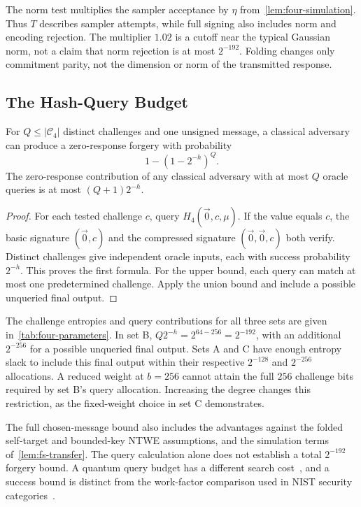 The norm test multiplies the sampler acceptance by $\eta$ from~\cref{lem:four-simulation}. Thus $T$ describes sampler attempts, while full signing also includes norm and encoding rejection. The multiplier $1.02$ is a cutoff near the typical Gaussian norm, not a claim that norm rejection is at most $2^{-192}$. Folding changes only commitment parity, not the dimension or norm of the transmitted response.

\subsection{The Hash-Query Budget}



\begin{proposition}
\label{prop:challenge-search}
For $Q\le|\mathcal C_4|$ distinct challenges and one unsigned message, a classical adversary can produce a zero-response forgery with probability
\[
 1-(1-2^{-h})^Q.
\]
The zero-response contribution of any classical adversary with at most $Q$ oracle queries is at most $(Q+1)2^{-h}$.
\end{proposition}
\begin{proof}
For each tested challenge $c$, query $H_4(\vec0,c,\mu)$. If the value equals $c$, the basic signature $(\vec0,c)$ and the compressed signature $(\vec0,\vec0,c)$ both verify. Distinct challenges give independent oracle inputs, each with success probability $2^{-h}$. This proves the first formula. For the upper bound, each query can match at most one predetermined challenge. Apply the union bound and include a possible unqueried final output.
\end{proof}

The challenge entropies and query contributions for all three sets are given in~\cref{tab:four-parameters}. In set B, $Q2^{-h}=2^{64-256}=2^{-192}$, with an additional $2^{-256}$ for a possible unqueried final output. Sets A and C have enough entropy slack to include this final output within their respective $2^{-128}$ and $2^{-256}$ allocations. A reduced weight at $b=256$ cannot attain the full $256$ challenge bits required by set B's query allocation. Increasing the degree changes this restriction, as the fixed-weight choice in set C demonstrates.

The full chosen-message bound also includes the advantages against the folded self-target and bounded-key NTWE assumptions, and the simulation terms of~\cref{lem:fs-transfer}. The query calculation alone does not establish a total $2^{-192}$ forgery bound. A quantum query budget has a different search cost~\cite{GroverSearch,BBHTSearch}, and a success bound is distinct from the work-factor comparison used in NIST security categories~\cite{NISTCategories}.

\FloatBarrier
